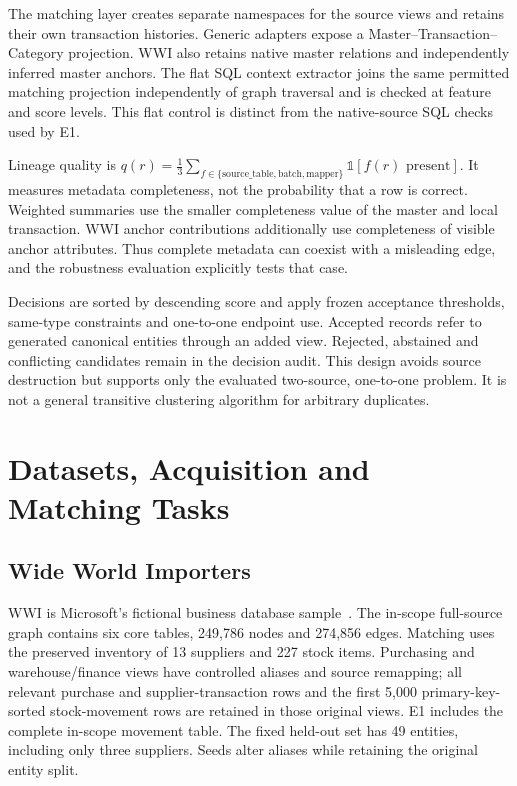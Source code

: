 \documentclass[11pt,letterpaper]{article}
\begin{document}
The matching layer creates separate namespaces for the source views and retains their own transaction histories. Generic adapters expose a Master--Transaction--Category projection. WWI also retains native master relations and independently inferred master anchors. The flat SQL context extractor joins the same permitted matching projection independently of graph traversal and is checked at feature and score levels. This flat control is distinct from the native-source SQL checks used by E1.

Lineage quality is $q(r)=\frac{1}{3}\sum_{f\in\{\mathrm{source\_table,batch,mapper}\}}\mathbb{1}[f(r)\text{ present}]$. It measures metadata completeness, not the probability that a row is correct. Weighted summaries use the smaller completeness value of the master and local transaction. WWI anchor contributions additionally use completeness of visible anchor attributes. Thus complete metadata can coexist with a misleading edge, and the robustness evaluation explicitly tests that case.

Decisions are sorted by descending score and apply frozen acceptance thresholds, same-type constraints and one-to-one endpoint use. Accepted records refer to generated canonical entities through an added view. Rejected, abstained and conflicting candidates remain in the decision audit. This design avoids source destruction but supports only the evaluated two-source, one-to-one problem. It is not a general transitive clustering algorithm for arbitrary duplicates.

\section{Datasets, Acquisition and Matching Tasks}
\begin{table}[t]\centering\small
\caption{Native graph size versus matching population. Groups are original matching entities; each supplies two source-view observations. Native ingestion and matching scopes differ.}\label{tab:profiles}\end{table}
\subsection{Wide World Importers}
WWI is Microsoft's fictional business database sample~\cite{wwi}. The in-scope full-source graph contains six core tables, 249,786 nodes and 274,856 edges. Matching uses the preserved inventory of 13 suppliers and 227 stock items. Purchasing and warehouse/finance views have controlled aliases and source remapping; all relevant purchase and supplier-transaction rows and the first 5,000 primary-key-sorted stock-movement rows are retained in those original views. E1 includes the complete in-scope movement table. The fixed held-out set has 49 entities, including only three suppliers. Seeds alter aliases while retaining the original entity split.
\end{document}
